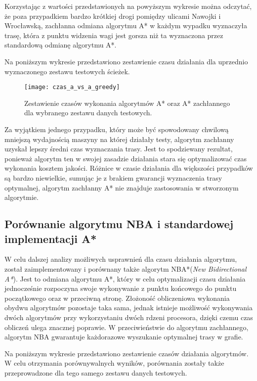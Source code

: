 Korzystając z wartości przedstawionych na powyższym wykresie można odczytać, że poza przypadkiem bardzo krótkiej drogi pomiędzy ulicami Nawojki i Wrocławską, zachłanna odmiana algorytmu A* w każdym wypadku wyznaczyła trasę, która z punktu widzenia wagi jest gorsza niż ta wyznaczona przez standardową odmianę algorytmu A*.

Na poniższym wykresie przedstawiono zestawienie czasu działania dla uprzednio wyznaczonego zestawu testowych ścieżek.

\begin{figure}[H]
\centering
\texttt{[image: czas\_a\_vs\_a\_greedy]}
\caption{Zestawienie czasów wykonania algorytmów A* oraz A* zachłannego dla wybranego zestawu danych testowych.}
\end{figure}

Za wyjątkiem jednego przypadku, który może być spowodowany chwilową mniejszą wydajnością maszyny na której działały testy, algorytm zachłanny uzyskał lepszy średni czas wyznaczania trasy. Jest to spodziewany rezultat, ponieważ algorytm ten w swojej zasadzie działania stara się optymalizować czas wykonania kosztem jakości. Różnice w czasie działania dla większości przypadków są bardzo niewielkie, sumując je z brakiem gwarancji wyznaczenia trasy optymalnej, algorytm zachłanny A* nie znajduje zastosowania w stworzonym algorytmie.

\subsection{Porównanie algorytmu NBA i standardowej implementacji A*}

W celu dalszej analizy możliwych usprawnień dla czasu działania algorytmu, został zaimplementowany i porównany także algorytm NBA*(\textit{New Bidirectional A*}). Jest to odmiana algorytmu A*, który w celu optymalizacji czasu działania jednocześnie rozpoczyna swoje wykonywanie z punktu końcowego do punktu początkowego oraz w przeciwną stronę. Złożoność obliczeniowa wykonania obydwu algorytmów pozostaje taka sama, jednak istnieje możliwość wykonywania dwóch algorytmów przy wykorzystaniu dwóch rdzeni procesora, dzięki czemu czas obliczeń ulega znacznej poprawie. W przeciwieństwie do algorytmu zachłannego, algorytm NBA gwarantuje każdorazowe wyszukanie optymalnej trasy w grafie.

Na poniższym wykresie przedstawiono zestawienie czasów działania algorytmów. W celu otrzymania porównywalnych wyników, porównania zostały także przeprowadzone dla tego samego zestawu danych testowych.

